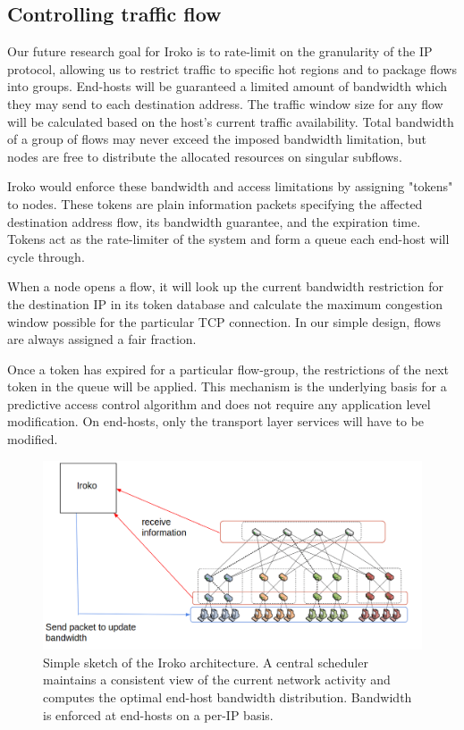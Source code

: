 \subsection{Controlling traffic flow}
Our future research goal for Iroko is to rate-limit on the granularity of the IP protocol, allowing us 
to restrict traffic to specific hot regions and to package flows into groups.
End-hosts will be guaranteed a limited amount of bandwidth which they may send to 
each destination address. The traffic window size for any flow will be calculated 
based on the host's current traffic availability. Total bandwidth of a group of 
flows may never exceed the imposed bandwidth limitation, but nodes are free to 
distribute the allocated resources on singular subflows.

Iroko would enforce these bandwidth and access limitations by assigning "tokens" to nodes. These tokens are plain information packets 
specifying the affected destination address flow, its bandwidth guarantee, and 
the expiration time. Tokens act as the rate-limiter of the system and form a 
queue each end-host will cycle through.

When a node opens a flow, it will look up the current bandwidth restriction for 
the destination IP in its token database and calculate the maximum congestion 
window possible for the particular TCP connection. In our simple design, flows 
are always assigned a fair fraction.

Once a token has expired for a particular flow-group, the restrictions of the 
next token in the queue will be applied. This mechanism is the underlying basis 
for a predictive access control algorithm and does not require any application 
level modification. On end-hosts, only the transport layer services will have 
to be modified.

\begin{figure}
\centering
\includegraphics[width=1\linewidth]{Iroko}
\caption{Simple sketch of the Iroko architecture. A central scheduler maintains 
a consistent view of the current network activity and computes the optimal 
end-host bandwidth distribution. Bandwidth is enforced at end-hosts on a per-IP 
basis.}
\label{fig:Topology3}
\end{figure}



